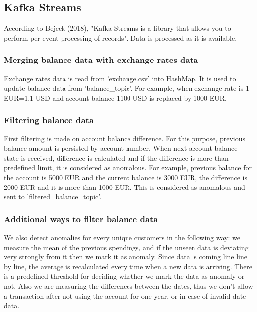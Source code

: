 \documentclass{article}
\begin{document}
\subsection{Kafka Streams}

According to Bejeck (2018), "Kafka Streams is a library that allows you to perform per-event processing of records". Data is processed as it is available.

\subsubsection{Merging balance data with exchange rates data}

Exchange rates data is read from 'exchange.csv' into HashMap. It is used to update balance data from 'balance\_topic'. For example, when exchange rate is 1 EUR=1.1 USD and account balance 1100 USD is replaced by 1000 EUR.

\subsubsection{Filtering balance data}

First filtering is made on account balance difference. For this purpose, previous balance amount is persisted by account number. When next account balance state is received, difference is calculated and if the difference is more than predefined limit, it is considered as anomalous. For example, previous balance for the account is 5000 EUR and the current balance is 3000 EUR, the difference is 2000 EUR and it is more than 1000 EUR. This is considered as anomalous and sent to 'filtered\_balance\_topic'.

\subsubsection{Additional ways to filter balance data}

We also detect anomalies for every unique customers in the following way: we measure the mean of the previous spendings, and if the unseen data is deviating very strongly from it then we mark it as anomaly. Since data is coming line line by line, the average is recalculated every time when a new data is arriving. There is a predefined threshold for deciding whether we mark the data as anomaly or not. Also we are measuring the differences between the dates, thus we don't allow a transaction after not using the account for one year, or in case of invalid date data. 
\end{document}
